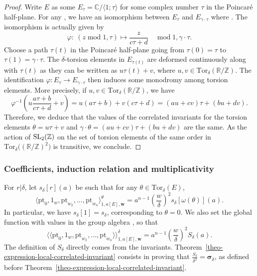 \documentclass[11pt]{article}
\numberwithin{equation}{section}
\newcommand{\Tor}{\mathrm{Tor}}
\newcommand{\pt}{\mathrm{pt}}
\newcommand{\modulo}{ \operatorname{mod} }
\newcommand{\ZZ}{\mathbb{Z}}
\newcommand{\RR}{\mathbb{R}}
\newcommand{\CC}{\mathbb{C}}
\newcommand{\bfw}{ {\boldsymbol w} }
\numberwithin{equation}{section}
\theoremstyle{definition}
\begin{document}
\begin{proof}
 Write $E$ as some $E_\tau=\CC/\langle1;\tau\rangle$ for some complex number $\tau$ in the Poincar\'e half-plane. For any \smash{$\gamma=\bigl(\begin{smallmatrix}
 a & b \\ c & d \\
 \end{smallmatrix}\bigr)\in {\rm SL}_2(\ZZ)$}, we have an isomorphism between $E_\tau$ and $E_{\gamma\cdot\tau}$ where . The isomorphism is actually given by
 \[ \varphi\colon\ (z \modulo 1,\tau) \longmapsto \frac{z}{c\tau+d} \quad \modulo 1,\gamma\cdot\tau. \]
 Choose a path $\tau(t)$ in the Poincar\'e half-plane going from $\tau(0)=\tau$ to $\tau(1)=\gamma\cdot\tau$. The $\delta$-torsion elements in $E_{\tau(t)}$ are deformed continuously along with $\tau(t)$ as they can be written as $u\tau(t)+v$, where $u,v\in\Tor_\delta(\RR/\ZZ)$. The identification $\varphi\colon E_\tau\to E_{\gamma\cdot\tau}$ then induces some monodromy among torsion elements. More precisely, if $u,v\in \Tor_\delta(\RR/\ZZ)$, we have
 \[ \varphi^{-1}\left(u\frac{a\tau+b}{c\tau+d}+v \right)=u(a\tau+b)+v(c\tau+d) = (au+cv)\tau+(bu+dv). \]
 Therefore, we deduce that the values of the correlated invariants for the torsion elements $\theta=u\tau+v$ and $\gamma\cdot\theta=(au+cv)\tau+(bu+dv)$ are the same. As the action of ${\rm SL}_2(\ZZ)$ on the set of torsion elements of the same order in $\Tor_\delta\bigl((\RR/\ZZ)^2\bigr)$ is transitive, we conclude.
\end{proof}

\subsubsection{Coefficients, induction relation and multiplicativity} For $r|\delta$, let $s_\delta[r](a)$ be such that for any $\theta\in\Tor_\delta(E)$,
\[ \langle\pt_0,1_w,\pt_{w_2},\dots,\pt_{w_n}\rangle_{1,a[E],\bfw}^\theta = a^{n-1}\left(\frac{w}{\delta}\right)^2 s_\delta[\omega(\theta)](a). \]
In particular, we have $s_\delta[1]=s_\delta$, corresponding to $\theta=0$. We also set the global function with values in the group algebra , so that
\[ \langle\langle\pt_0,1_w,\pt_{w_2},\dots,\pt_{w_n}\rangle\rangle^\delta_{1,a[E],\bfw} = a^{n-1}\left(\frac{w}{\delta}\right)^2 S_\delta(a). \]
The definition of $S_\delta$ directly comes from the invariants. Theorem~\ref{theo-expression-local-correlated-invariant} consists in proving that $\frac{S_\delta}{\delta^2}=\boldsymbol{\sigma}_\delta$, as defined before Theorem~\ref{theo-expression-local-correlated-invariant}.
\end{document}
